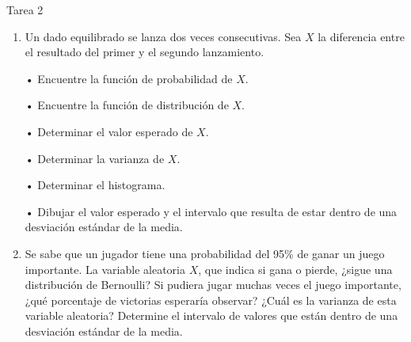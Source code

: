 \documentclass[a4paper, 12pt]{article}
\newcommand{\Pspace}{0.5cm}
\newcommand{\Aspace}{0.2cm}
\begin{document}
\newpage
\begin{center}
    { \LARGE Tarea 2}
\end{center}

\begin{enumerate}
    \item Un dado equilibrado se lanza dos veces consecutivas. Sea $X$ la diferencia entre el resultado del primer y el segundo lanzamiento.
    \vspace{\Aspace} \par
    • Encuentre la función de probabilidad de $X$.
    \\ { \color{azul}  }

    \vspace{\Aspace} \par
    • Encuentre la función de distribución de $X$.
    \\ { \color{azul}  }

    \vspace{\Aspace} \par
    • Determinar el valor esperado de $X$.
    \\ { \color{azul}  }

    \vspace{\Aspace} \par
    • Determinar la varianza de $X$.
    \\ { \color{azul}  }

    \vspace{\Aspace} \par
    • Determinar el histograma.
    \\ { \color{azul}  }

    \vspace{\Aspace} \par
    • Dibujar el valor esperado y el intervalo que resulta de estar dentro de una desviación estándar de la media.
    \\ { \color{azul}  }


    \vspace{\Pspace}
    \item Se sabe que un jugador tiene una probabilidad del 95\% de ganar un juego importante. La variable aleatoria $X$, que indica si gana o pierde, ¿sigue una distribución de Bernoulli? Si pudiera jugar muchas veces el juego importante, ¿qué porcentaje de victorias esperaría observar? ¿Cuál es la varianza de esta variable aleatoria? Determine el intervalo de valores que están dentro de una desviación estándar de la media.
    \vspace{\Aspace} \par
    { \color{azul}  }
\end{enumerate}
\end{document}

